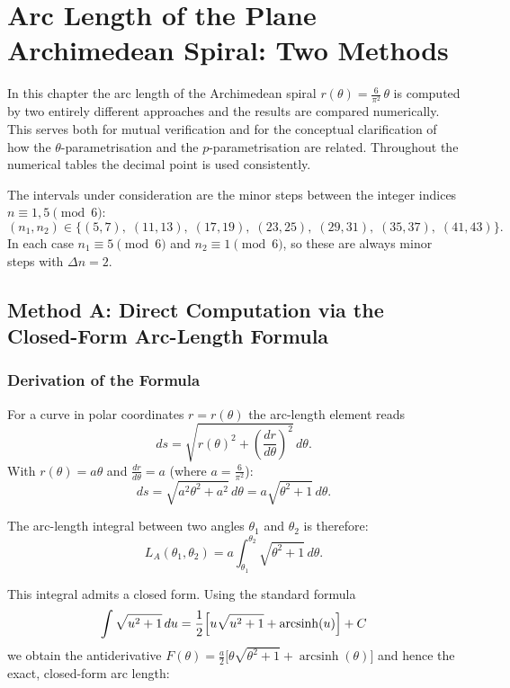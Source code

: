 \chapter{Arc Length of the Plane Archimedean Spiral: Two Methods}
\label{sec:bogenlaenge_spirale}

In this chapter the arc length of the Archimedean spiral
$r(\theta) = \frac{6}{\pi^2}\,\theta$ is computed by two entirely different
approaches and the results are compared numerically. This serves both for
mutual verification and for the conceptual clarification of how the
$\theta$-parametrisation and the $p$-parametrisation are related. Throughout
the numerical tables the decimal point is used consistently.

The intervals under consideration are the minor steps between the
integer indices $n \equiv 1, 5 \pmod 6$:
\[
(n_1, n_2) \in
\{(5,7),\;(11,13),\;(17,19),\;(23,25),\;(29,31),\;(35,37),\;(41,43)\}.
\]
In each case $n_1 \equiv 5 \pmod 6$ and $n_2 \equiv 1 \pmod 6$, so these
are always minor steps with $\Delta n = 2$.

\section{Method A: Direct Computation via the Closed-Form Arc-Length Formula}
\label{sec:methode_A}

\subsection{Derivation of the Formula}

For a curve in polar coordinates $r = r(\theta)$ the arc-length
element reads
\[
ds = \sqrt{r(\theta)^2 + \left(\frac{dr}{d\theta}\right)^2}\,d\theta.
\]
With $r(\theta) = a\theta$ and $\frac{dr}{d\theta} = a$ (where $a = \frac{6}{\pi^2}$):
\[
ds = \sqrt{a^2\theta^2 + a^2}\,d\theta = a\sqrt{\theta^2 + 1}\,d\theta.
\]

The arc-length integral between two angles $\theta_1$ and $\theta_2$ is therefore:
\[
L_A(\theta_1, \theta_2)
= a\int_{\theta_1}^{\theta_2}\sqrt{\theta^2 + 1}\,d\theta.
\]

This integral admits a closed form. Using the standard formula
\[
\int \sqrt{u^2+1}\,du
= \frac{1}{2}\Bigl[u\sqrt{u^2+1} + \operatorname{arcsinh}(u)\Bigr] + C
\]
we obtain the antiderivative $F(\theta) = \frac{a}{2}\bigl[\theta\sqrt{\theta^2+1}
+ \operatorname{arcsinh}(\theta)\bigr]$ and hence the exact, closed-form arc length:

